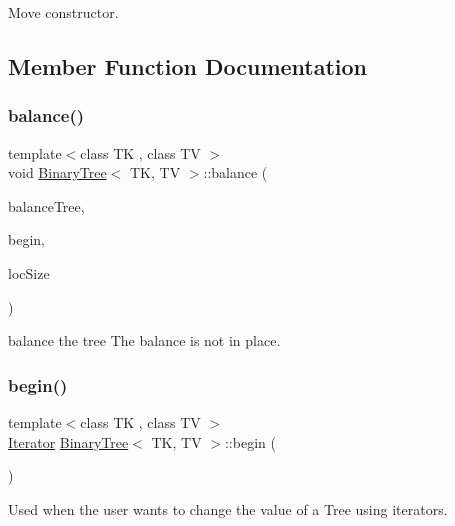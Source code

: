 Move constructor. 

\subsection{Member Function Documentation}
\mbox{\label{classBinaryTree_a1c3972b0a02afa3c6c35dcad6b8440c5}} 
\subsubsection{\texorpdfstring{balance()}{balance()}}
{\footnotesize\ttfamily template$<$class TK , class TV $>$ \\
void \mbox{\hyperlink{classBinaryTree}{Binary\+Tree}}$<$ TK, TV $>$\+::balance (\begin{DoxyParamCaption}\item[{\mbox{\hyperlink{classBinaryTree}{Binary\+Tree}}$<$ TK, TV $>$ \&}]{balance\+Tree,  }\item[{\mbox{\hyperlink{classBinaryTree_1_1Iterator}{Iterator}}}]{begin,  }\item[{std\+::size\+\_\+t}]{loc\+Size }\end{DoxyParamCaption})}

balance the tree The balance is not in place. \mbox{\label{classBinaryTree_a828acf65e70cf4b6e106807a052ca508}} 
\subsubsection{\texorpdfstring{begin()}{begin()}\hspace{0.1cm}{\footnotesize\ttfamily [1/2]}}
{\footnotesize\ttfamily template$<$class TK , class TV $>$ \\
\mbox{\hyperlink{classBinaryTree_1_1Iterator}{Iterator}} \mbox{\hyperlink{classBinaryTree}{Binary\+Tree}}$<$ TK, TV $>$\+::begin (\begin{DoxyParamCaption}{ }\end{DoxyParamCaption})\hspace{0.3cm}{\ttfamily [inline]}}

Used when the user wants to change the value of a Tree using iterators. \mbox{\label{classBinaryTree_aaf9049aa9e91bed50e9543b6db442d80}} 
